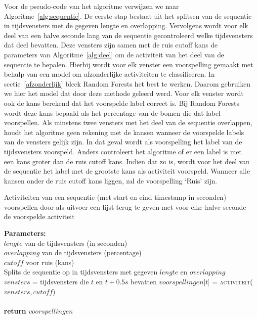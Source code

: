 \documentclass{article}
\begin{document}
Voor de pseudo-code van het algoritme verwijzen we naar Algoritme~\ref{alg:sequentie}. De eerste stap bestaat uit het splitsen van de sequentie in tijdsvensters met de gegeven lengte en overlapping. Vervolgens wordt voor elk deel van een halve seconde lang van de sequentie gecontroleerd welke tijdsvensters dat deel bevatten. Deze vensters zijn samen met de ruis cutoff kans de parameters van Algoritme~\ref{alg:deel} om de activiteit van het deel van de sequentie te bepalen. Hierbij wordt voor elk venster een voorspelling gemaakt met behulp van een model om afzonderlijke activiteiten te classificeren. In sectie~\ref{afzonderlijk} bleek Random Forests het best te werken. Daarom gebruiken we hier het model dat door deze methode geleerd werd. Voor elk venster wordt ook de kans berekend dat het voorspelde label correct is. Bij Random Forests wordt deze kans bepaald als het percentage van de bomen die dat label voorspellen. %
Als minstens twee vensters met het deel van de sequentie overlappen, houdt het algoritme geen rekening met de kansen wanneer de voorspelde labels van de vensters gelijk zijn. In dat geval wordt als voorspelling het label van de tijdsvensters voorspeld. Anders controleert het algoritme of er een label is met een kans groter dan de ruis cutoff kans. Indien dat zo is, wordt voor het deel van de sequentie het label met de grootste kans als activiteit voorspeld. Wanneer alle kansen onder de ruis cutoff kans liggen, zal de voorspelling `Ruis' zijn.

\begin{algorithm}
  \caption{Activiteiten van een sequentie (met start en eind timestamp in seconden) voorspellen door als uitvoer een lijst terug te geven met voor elke halve seconde de voorspelde activiteit}
  \label{alg:sequentie}
  \begin{algorithmic}[0]
    \State \textbf{Parameters:}\\
    $lengte$ van de tijdsvensters (in seconden) \\
    $overlapping$ van de tijdsvensters (percentage) \\
    $cutoff$ voor ruis (kans) \\
    \State Splits de sequentie op in tijdsvensters met gegeven $lengte$ en $overlapping$ \\
      \State $vensters$ = tijdsvensters die $t$ en $t+0.5s$ bevatten
      \State $voorspellingen$[$t$] = \textsc{activiteit}($vensters,cutoff$) \\
    \EndFor \\
    \State \textbf{return} $voorspellingen$
  \end{algorithmic}
\end{algorithm}
\end{document}

